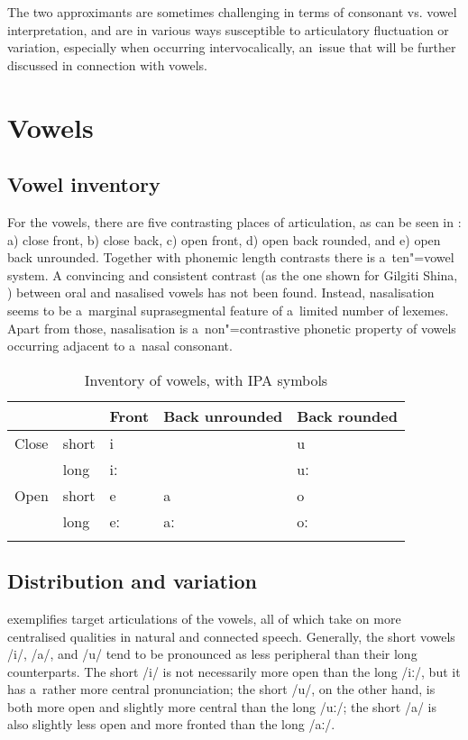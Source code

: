 The two approximants are sometimes challenging in terms of consonant vs. vowel interpretation, and are in various ways susceptible to articulatory fluctuation or variation, especially when occurring intervocalically, an~issue that will be further discussed in connection with vowels.


\section{Vowels}
\label{sec:3-2}

\subsection{Vowel inventory}

For the vowels, there are five contrasting places of articulation, as can be seen in : a) close front, b) close back, c) open front, d) open back rounded, and e) open back unrounded. Together with phonemic length contrasts there is a~ten"=vowel system. A convincing and consistent contrast (as the one shown for Gilgiti Shina, \citealt[19]{radloff1999}) between oral and nasalised vowels has not been found. Instead, nasalisation seems to be a~marginal suprasegmental feature of a~limited number of lexemes. Apart from those, nasalisation is a~non"=contrastive phonetic property of vowels occurring adjacent to a~nasal consonant. 



\begin{table}[ht]
\caption{Inventory of vowels, with IPA symbols}
\begin{tabularx}{\textwidth}{ Q Q Q Q Q }
\lsptoprule
&
&
Front
&
Back unrounded &
Back rounded \\\hline
Close &
short &
i &
&
u\\
&
long &
iː &
&
uː\\
Open &
short &
e &
a &
o\\
&
long &
eː &
aː &
oː\\\lspbottomrule
\end{tabularx}
\label{tab:3-3}
\end{table}

\subsection{Distribution and variation}
\label{subsec:3-2-1}

 exemplifies target articulations of the vowels, all of which take on more centralised qualities in natural and connected speech. Generally, the short vowels /i/, /a/, and /u/ tend to be pronounced as less peripheral than their long counterparts. The short /i/ is not necessarily more open than the long /iː/, but it has a~rather more central pronunciation; the short /u/, on the other hand, is both more open and slightly more central than the long /uː/; the short /a/ is also slightly less open and more fronted than the long /aː/. 


